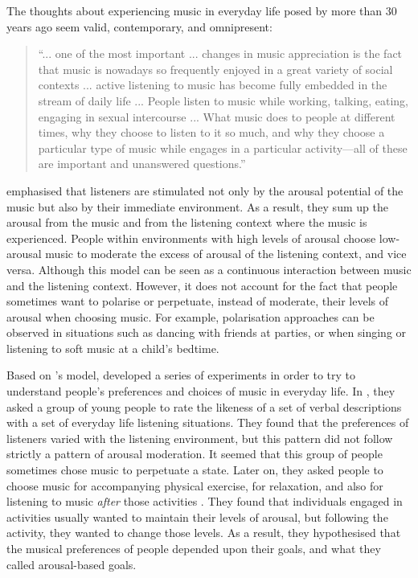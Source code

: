 The thoughts about experiencing music in everyday life posed by \textcite[p. 499]{konecni82social} more than 30 years ago seem valid, contemporary, and omnipresent: 

\begin{quote}
``... one of the most important ... changes in music appreciation is the fact that music is nowadays so frequently enjoyed in a great variety of social contexts ... active listening to music has become fully embedded in the stream of daily life ... People listen to music while working, talking, eating, engaging in sexual intercourse ... What music does to people at different times, why they choose to listen to it so much, and why they choose a particular type of music while engages in a particular activity---all of these are important and unanswered questions.''
\end{quote}

\textcite{konecni82social} emphasised that listeners are stimulated not only by the arousal potential of the music but also by their immediate environment. As a result, they sum up the arousal from the music and from the listening context where the music is experienced. People within environments with high levels of arousal choose low-arousal music to moderate the excess of arousal of the listening context, and vice versa. 
Although this model can be seen as a continuous interaction between music and the listening context. However, it does not account for the fact that people sometimes want to polarise or perpetuate, instead of moderate, their levels of arousal when choosing music. 
For example, polarisation approaches can be observed in situations such as dancing with friends at parties, or when singing or listening to soft music at a child's bedtime.

Based on \citeauthor{konecni82social}'s model, \citeauthor{north96situational} developed a series of experiments in order to try to understand people's preferences and choices of music in everyday life.
In \textcite{north96situational}, they asked a group of young people to rate the likeness of a set of verbal descriptions with a set of everyday life listening situations. They found that the preferences of listeners varied with the listening environment, but this pattern did not follow strictly a pattern of arousal moderation. It seemed that this group of people sometimes chose music to perpetuate a state.
Later on, they asked people to choose music for accompanying physical exercise, for relaxation, and also for listening to music \textit{after} those activities \autocite{north00musical}.  They found that individuals engaged in activities usually wanted to maintain their levels of arousal, but following the activity, they wanted to change those levels. As a result, they hypothesised that the musical preferences of people depended upon their goals, and what they called arousal-based goals.

